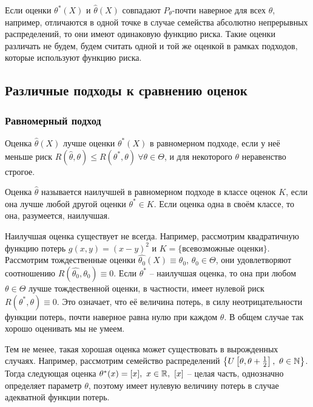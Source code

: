 \begin{note}
    Если оценки $\theta^*(X)$ и $\hat{\theta}(X)$ совпадают $P_\theta$-почти наверное для всех $\theta$, например, отличаются в одной точке в случае семейства абсолютно непрерывных распределений, то они имеют одинаковую функцию риска. Такие оценки различать не будем, будем считать одной и той же оценкой в рамках подходов, которые используют функцию риска.
\end{note}

\subsection{Различные подходы к сравнению оценок}

\subsubsection{Равномерный подход}

\begin{definition}
    Оценка $\hat{\theta}(X)$ лучше оценки $\theta^*(X)$ в равномерном подходе, если у неё меньше риск $R(\hat{\theta}, \theta) \le R(\theta^*, \theta) \ \forall \theta \in \Theta$, и для некоторого $\theta$ неравенство строгое.
\end{definition}

\begin{definition}
    Оценка $\hat{\theta}$ называется наилучшей в равномерном подходе в классе оценок $K$, если она лучше любой другой оценки $\theta^* \in K$. Если оценка одна в своём классе, то она, разумеется, наилучшая.
\end{definition}

\begin{note}
    Наилучшая оценка существует не всегда. Например, рассмотрим квадратичную функцию потерь $g(x, y) = (x-y)^2$ и $K = \{\text{всевозможные оценки}\}$. Рассмотрим тождественные оценки $\hat{\theta_0}(X) \equiv \theta_0$, $\theta_0 \in \Theta$, они удовлетворяют соотношению $R(\hat{\theta_0}, \theta_0) \equiv 0$. Если $\theta^*$ -- наилучшая оценка, то она при любом $\theta \in \Theta$ лучше тождественной оценки, в частности, имеет нулевой риск $R(\theta^*, \theta) \equiv 0$. Это означает, что её величина потерь, в силу неотрицательности функции потерь, почти наверное равна нулю при каждом $\theta$. В общем случае так хорошо оценивать мы не умеем.

    Тем не менее, такая хорошая оценка может существовать в вырожденных случаях. Например, рассмотрим семейство распределений $\left\{U\left[\theta, \theta+\frac{1}{2}\right],\ \theta \in \mathbb{N}\right\}$. Тогда следующая оценка $\theta^*(x) = [x],\ x \in \mathbb{R},\ [x]$ -- целая часть, однозначно определяет параметр $\theta$, поэтому имеет нулевую величину потерь в случае адекватной функции потерь.
\end{note}

